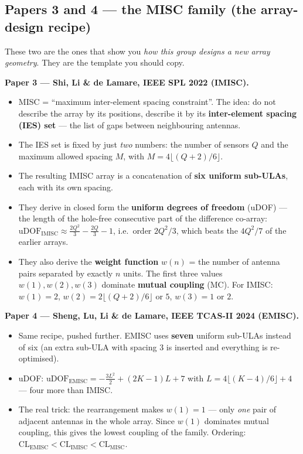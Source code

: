 \documentclass[11pt]{article}
\begin{document}
\subsection{Papers 3 and 4 --- the MISC family (the array-design recipe)}

These two are the ones that show you \emph{how this group designs a new array geometry}. They are the
template you should copy.

\textbf{Paper 3 --- Shi, Li \& de Lamare, IEEE SPL 2022 (IMISC).}
\begin{itemize}
\item MISC = ``maximum inter-element spacing constraint''. The idea: do not describe the array by its
positions, describe it by its \textbf{inter-element spacing (IES) set} --- the list of gaps between
neighbouring antennas.
\item The IES set is fixed by just \emph{two} numbers: the number of sensors $Q$ and the maximum
allowed spacing $M$, with $M=4\lfloor (Q+2)/6\rfloor$.
\item The resulting IMISC array is a concatenation of \textbf{six uniform sub-ULAs}, each with its
own spacing.
\item They derive in closed form the \textbf{uniform degrees of freedom} (uDOF) --- the length of the
hole-free consecutive part of the difference co-array:
$\mathrm{uDOF}_{\mathrm{IMISC}}\approx \tfrac{2Q^2}{3}-\tfrac{2Q}{3}-1$, i.e.\ order $2Q^2/3$,
which beats the $4Q^2/7$ of the earlier arrays.
\item They also derive the \textbf{weight function} $w(n)$ = the number of antenna pairs separated by
exactly $n$ units. The first three values $w(1),w(2),w(3)$ dominate \textbf{mutual coupling} (MC).
For IMISC: $w(1)=2$, $w(2)=2\lfloor (Q+2)/6\rfloor$ or $5$, $w(3)=1$ or $2$.
\end{itemize}

\textbf{Paper 4 --- Sheng, Lu, Li \& de Lamare, IEEE TCAS-II 2024 (EMISC).}
\begin{itemize}
\item Same recipe, pushed further. EMISC uses \textbf{seven} uniform sub-ULAs instead of six (an
extra sub-ULA with spacing 3 is inserted and everything is re-optimised).
\item uDOF: $\mathrm{uDOF}_{\mathrm{EMISC}}=-\tfrac{3L^2}{2}+(2K-1)L+7$ with
$L=4\lfloor (K-4)/6\rfloor+4$ --- four more than IMISC.
\item The real trick: the rearrangement makes $\boxed{w(1)=1}$ --- only \emph{one} pair of adjacent
antennas in the whole array. Since $w(1)$ dominates mutual coupling, this gives the lowest coupling
of the family. Ordering: $\mathrm{CL}_{\mathrm{EMISC}}<\mathrm{CL}_{\mathrm{IMISC}}<\mathrm{CL}_{\mathrm{MISC}}$.
\end{itemize}
\end{document}
